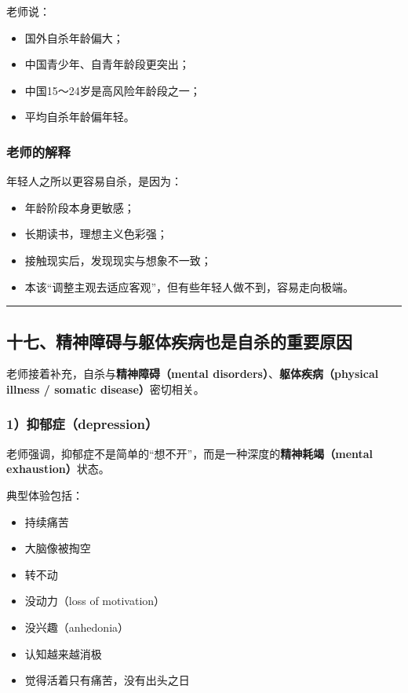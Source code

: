\documentclass[
  chinese,
  9pt,
  a4paper,
]{ctexart}
\providecommand{\tightlist}{%
  \setlength{\itemsep}{0pt}\setlength{\parskip}{0pt}}
\begin{document}
老师说：

\begin{itemize}
\tightlist
\item
  国外自杀年龄偏大；
\item
  中国青少年、自青年龄段更突出；
\item
  中国15～24岁是高风险年龄段之一；
\item
  平均自杀年龄偏年轻。
\end{itemize}

\subsubsection{老师的解释}\label{ux8001ux5e08ux7684ux89e3ux91ca-2}

年轻人之所以更容易自杀，是因为：

\begin{itemize}
\tightlist
\item
  年龄阶段本身更敏感；
\item
  长期读书，理想主义色彩强；
\item
  接触现实后，发现现实与想象不一致；
\item
  本该``调整主观去适应客观''，但有些年轻人做不到，容易走向极端。
\end{itemize}

\begin{center}\rule{0.5\linewidth}{0.5pt}\end{center}

\subsection{十七、精神障碍与躯体疾病也是自杀的重要原因}\label{ux5341ux4e03ux7cbeux795eux969cux788dux4e0eux8eafux4f53ux75beux75c5ux4e5fux662fux81eaux6740ux7684ux91cdux8981ux539fux56e0}

老师接着补充，自杀与\textbf{精神障碍（mental
disorders）}、\textbf{躯体疾病（physical illness / somatic
disease）}密切相关。

\subsubsection{1）抑郁症（depression）}\label{ux6291ux90c1ux75c7depression}

老师强调，抑郁症不是简单的``想不开''，而是一种深度的\textbf{精神耗竭（mental
exhaustion）}状态。

典型体验包括：

\begin{itemize}
\tightlist
\item
  持续痛苦
\item
  大脑像被掏空
\item
  转不动
\item
  没动力（loss of motivation）
\item
  没兴趣（anhedonia）
\item
  认知越来越消极
\item
  觉得活着只有痛苦，没有出头之日
\end{itemize}
\end{document}
